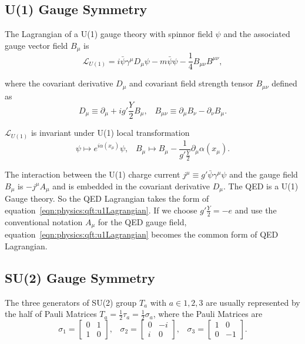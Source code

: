 \subsection{U(1) Gauge Symmetry}
The Lagrangian of a U(1) gauge theory with spinnor field $\psi$ and the associated gauge vector field $B_\mu$ is
% 
\begin{equation}
    \mathcal{L}_{U(1)} = i\bar{\psi}\gamma^\mu D_\mu \psi  - m\bar{\psi} \psi  - \frac{1}{4}B_{\mu\nu}B^{\mu\nu},
    \label{eqn:physics:qft:u1Lagrangian}
\end{equation}

\noindent where the covariant derivative $D_\mu$ and covariant field strength tensor $B_{\mu\nu}$ defined as
% 
\begin{equation}
    D_\mu \equiv \partial_\mu +i g' \frac{Y}{2} B_\mu , \;\;\; 
    B_{\mu\nu} \equiv  \partial_\mu B_\nu - \partial_\nu B_\mu.
\end{equation}

\noindent $\mathcal{L}_{U(1)}$ is invariant under U(1) local transformation
% 
\begin{equation}
	\psi \longmapsto e^{i\alpha(x_\mu)} \psi ,\;\;\; 
	B_\mu  \longmapsto  B_\mu - \frac{1}{g'\frac{Y}{2}}\partial_\mu \alpha(x_\mu).
\end{equation}

\noindent The interaction between the U(1) charge current $j^\mu \equiv g' \bar{\psi}\gamma^\mu \psi$ and the gauge field $B_\mu$ is $-j^\mu A_\mu$ and is embedded in the covariant derivative $D_\mu$. The QED is a U(1) Gauge theory. So the QED Lagrangian takes the form of equation~\ref{eqn:physics:qft:u1Lagrangian}. If we choose $g'\frac{Y}{2} = -e$ and use the conventional notation $A_\mu$ for the QED gauge field, equation~\ref{eqn:physics:qft:u1Lagrangian} becomes the common form of QED Lagrangian.


\subsection{SU(2) Gauge Symmetry}

The three generators of SU(2) group $T_a$ with $a \in {1,2,3 }$ are usually represented by the half of Pauli Matrices $T_a = \frac{1}{2} \tau_a = \frac{1}{2} \sigma_a$, where the Pauli Matrices are 
%
\begin{equation}
    \sigma_1 = \begin{bmatrix} 0 & 1 \\ 1 & 0\end{bmatrix}, \;\;\; 
    \sigma_2 = \begin{bmatrix} 0 & -i \\ i & 0\end{bmatrix}, \;\;\; 
    \sigma_3 = \begin{bmatrix} 1 & 0 \\ 0 & -1\end{bmatrix}.
\end{equation}


